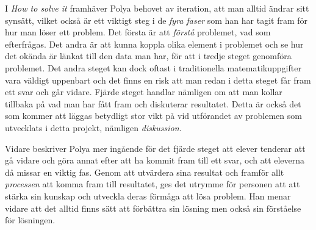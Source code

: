 \textcolor{Mahogany}{
    I \textsl{How to solve it} \cite{Polya} framhäver Polya behovet av iteration, att man alltid ändrar sitt synsätt, vilket också är ett viktigt steg i de \textsl{fyra faser} som han har tagit fram för hur man löser ett problem.
    Det första är att \textsl{förstå} problemet, vad som efterfrågas. Det andra är att kunna koppla olika element i problemet och se hur det okända är länkat till den data man har, för att i tredje steget genomföra problemet. 
    Det andra steget kan dock oftast i traditionella matematikuppgifter vara väldigt uppenbart och det finns en risk att man redan i detta steget får fram ett svar och går vidare. 
    Fjärde steget handlar nämligen om att man kollar tillbaka på vad man har fått fram och diskuterar resultatet. Detta är också det som kommer att läggas betydligt stor vikt på vid utförandet av problemen som utvecklats i detta projekt, nämligen \textsl{diskussion}.
}

\textcolor{Mahogany}{
    Vidare beskriver Polya mer ingående för det fjärde steget att elever tenderar att gå vidare och göra annat efter att ha kommit fram till ett svar, och att eleverna då missar en viktig fas. Genom att utvärdera sina resultat och framför allt \textsl{processen} att komma fram till resultatet, ges det utrymme för personen att att stärka sin kunskap och utveckla deras förmåga att lösa problem. Han menar vidare att det alltid finns sätt att förbättra sin lösning men också sin förståelse för lösningen.
}